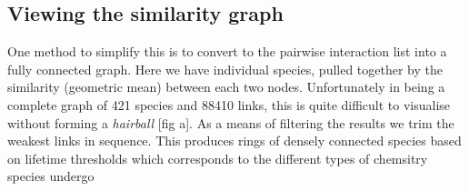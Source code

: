 \subsection{Viewing the similarity graph}

One method to simplify this is to convert to the pairwise interaction list into a fully connected graph. Here we have individual species, pulled together by the similarity (geometric mean) between each two nodes.
Unfortunately in being a complete graph of  421 species and 88410 links, this is quite difficult to visualise without forming a \emph{hairball} [fig a]. As a means of filtering the results we trim the weakest links in sequence. This produces rings of densely connected species based on lifetime thresholds which corresponds to the different types of chemsitry species undergo \\


